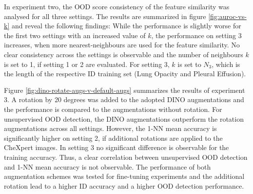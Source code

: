 \par
In experiment two, the OOD score consistency of the feature similarity was analysed for all three settings.
The results are summarized in figure \ref{fig:auroc-vs-k} and reveal the following findings:
While the performance is slightly worse for the first two settings with an increased value of $k$, the performance on setting 3 increases, when more nearest-neighbours are used for the feature similarity.
No clear consistency across the settings is observable and the number of neighbours $k$ is set to 1, if setting 1 or 2 are evaluated. 
For setting 3, $k$ is set to $N_3$, which is the length of the respective ID training set (Lung Opacity and Pleural Effusion).
\par
Figure \ref{fig:dino-rotate-augs-v-default-augs} summarizes the results of experiment 3. 
A rotation by 20 degrees was added to the adopted DINO augmentations and the performance is compared to the augmentations without rotation.
For unsupervised OOD detection, the DINO augmentations outperform the rotation augmentations across all settings.
However, the 1-NN mean accuracy is significantly higher on setting 2, if additional rotations are applied to the CheXpert images.
In setting 3 no significant difference is observable for the training accuracy.
Thus, a clear correlation between unsupervised OOD detection and 1-NN mean accuracy is not observable.
The performance of both augmentation schemes was tested for fine-tuning experiments and the additional rotation lead to a higher ID accuracy and a higher OOD detection performance. 
